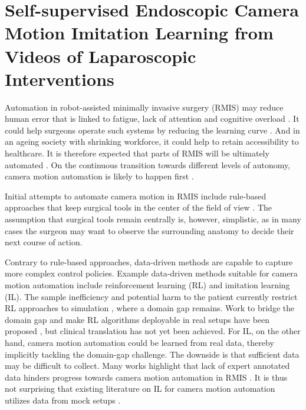 \graphicspath{{chapter_3}}
\chapter[Short tile for table of content]{Self-supervised Endoscopic Camera Motion Imitation Learning from Videos of Laparoscopic Interventions}
\label{chap:camera_motion_extraction}
\minitoc
Automation in robot-assisted minimally invasive surgery (RMIS) may reduce human error that is linked to fatigue, lack of attention and cognitive overload \cite{fiorini2022concepts}.
It could help surgeons operate such systems by reducing the learning curve \cite{van2018learning}.
And in an ageing society with shrinking workforce, it could help to retain accessibility to healthcare. It is therefore expected that parts of RMIS will be ultimately automated \cite{davenport2019potential,zidane2022robotics}. On the continuous transition towards different levels of autonomy, camera motion automation is likely to happen first \cite{kitaguchi2022artificial}.

Initial attempts to automate camera motion in RMIS include rule-based approaches that keep surgical tools in the center of the field of view \cite{da2020scan,garcia2022robotic,sandoval2021towards}. The assumption that surgical tools remain centrally is, however, simplistic, as in many cases the surgeon may want to observe the surrounding anatomy to decide their next course of action. 

Contrary to rule-based approaches, data-driven methods are capable to capture more complex control 
policies.
Example data-driven methods suitable for camera motion automation include reinforcement learning (RL) and imitation learning (IL). The sample inefficiency and potential harm to the patient currently restrict RL approaches to simulation \cite{su2021multicamera,scheikl2023lapgym,agrawal2018automating}, where a domain gap remains. Work to bridge the domain gap and make RL algorithms deployable in real setups have been proposed \cite{cartucho2021visionblender,marzullo2021towards}, but clinical translation has not yet been achieved. For IL, on the other hand, camera motion automation could be learned from real data, thereby implicitly tackling the domain-gap challenge. The downside is that sufficient data may be difficult to collect. Many works highlight that lack of expert annotated data hinders progress towards camera motion automation in RMIS \cite{maier2022surgical,kassahun2016surgical,esteva2019guide}.
It is thus not surprising that existing literature on IL for camera motion automation utilizes data from mock setups \cite{ji2018learning,wagner2021learning}.

